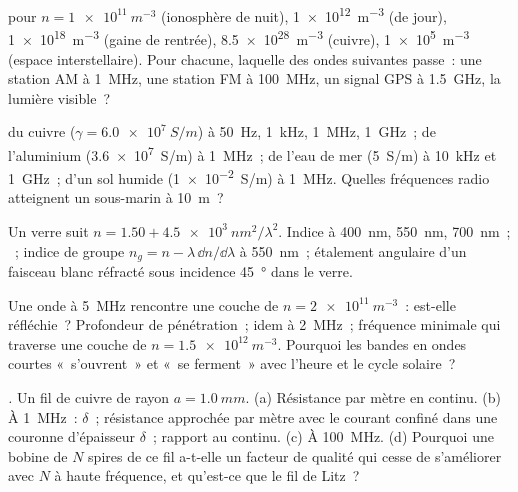 \begin{exercise}[$\star$]\label{exo:b2:waves-in-media:1}
 pour $n = \qty{1e11}{m^{-3}}$ (ionosphère de nuit),
\qty{1e12}{m^{-3}} (de jour), \qty{1e18}{m^{-3}} (gaine de rentrée), \qty{8.5e28}{m^{-3}}
(cuivre), \qty{1e5}{m^{-3}} (espace interstellaire). Pour chacune, laquelle des
ondes suivantes passe~: une station AM à \qty{1}{MHz}, une station FM à \qty{100}{MHz}, un
signal GPS à \qty{1.5}{GHz}, la lumière visible~?
\end{exercise}

\begin{exercise}[$\star$]\label{exo:b2:waves-in-media:2}
 du cuivre ($\gamma = \qty{6.0e7}{S/m}$) à \qty{50}{Hz}, \qty{1}{kHz},
\qty{1}{MHz}, \qty{1}{GHz}~; de l'aluminium (\qty{3.6e7}{S/m}) à \qty{1}{MHz}~; de l'eau
de mer (\qty{5}{S/m}) à \qty{10}{kHz} et \qty{1}{GHz}~; d'un sol humide (\qty{1e-2}{S/m})
à \qty{1}{MHz}. Quelles fréquences radio atteignent un sous-marin à \qty{10}{m}~?
\end{exercise}

\begin{exercise}[$\star$]\label{exo:b2:waves-in-media:3}
Un verre suit $n = 1.50 + \qty{4.5e3}{nm^2}/\lambda^2$. Indice à \qty{400}{nm},
\qty{550}{nm}, \qty{700}{nm}~; ~; indice de groupe $n_g = n -
\lambda\,\dd n/\dd\lambda$ à \qty{550}{nm}~; étalement angulaire d'un faisceau blanc
réfracté sous incidence \qty{45}{\degree} dans le verre.
\end{exercise}

\begin{exercise}[$\star$]\label{exo:b2:waves-in-media:4}
Une onde à \qty{5}{MHz} rencontre une couche de $n = \qty{2e11}{m^{-3}}$~: est-elle
réfléchie~? Profondeur de pénétration~; idem à \qty{2}{MHz}~; fréquence minimale
qui traverse une couche de $n = \qty{1.5e12}{m^{-3}}$. Pourquoi les bandes en ondes courtes
«~s'ouvrent~» et «~se ferment~» avec l'heure et le cycle solaire~?
\end{exercise}

\begin{exercise}[$\star\star$]\label{exo:b2:waves-in-media:5}
\emph{.} Un fil de cuivre de rayon $a = \qty{1.0}{mm}$. (a) Résistance
par mètre en continu. (b) À \qty{1}{MHz}~: $\delta$~; résistance approchée
par mètre avec le courant confiné dans une couronne d'épaisseur $\delta$~;
rapport au continu. (c) À \qty{100}{MHz}. (d) Pourquoi une bobine de $N$ spires de
ce fil a-t-elle un facteur de qualité qui cesse de s'améliorer avec $N$ à haute
fréquence, et qu'est-ce que le fil de Litz~?
\end{exercise}

